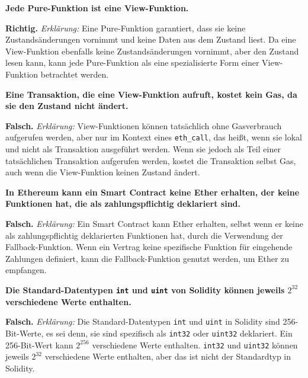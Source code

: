 \documentclass[german]{../uebung}
\begin{document}
\begin{exercise}{4}
    \item \textbf{Jede Pure-Funktion ist eine View-Funktion.}

    \textbf{Richtig.}
    \newline
    \textit{Erklärung:} Eine Pure-Funktion garantiert, dass sie keine Zustandsänderungen vornimmt und keine Daten aus dem Zustand liest. Da eine View-Funktion ebenfalls keine Zustandsänderungen vornimmt, aber den Zustand lesen kann, kann jede Pure-Funktion als eine spezialisierte Form einer View-Funktion betrachtet werden.

    \item \textbf{Eine Transaktion, die eine View-Funktion aufruft, kostet kein Gas, da sie den Zustand nicht ändert.}

    \textbf{Falsch.}
    \newline
    \textit{Erklärung:} View-Funktionen können tatsächlich ohne Gasverbrauch aufgerufen werden, aber nur im Kontext eines \texttt{eth\_call}, das heißt, wenn sie lokal und nicht als Transaktion ausgeführt werden. Wenn sie jedoch als Teil einer tatsächlichen Transaktion aufgerufen werden, kostet die Transaktion selbst Gas, auch wenn die View-Funktion keinen Zustand ändert.

    \item \textbf{In Ethereum kann ein Smart Contract keine Ether erhalten, der keine Funktionen hat, die als zahlungspflichtig deklariert sind.}

    \textbf{Falsch.}
    \newline
    \textit{Erklärung:} Ein Smart Contract kann Ether erhalten, selbst wenn er keine als zahlungspflichtig deklarierten Funktionen hat, durch die Verwendung der Fallback-Funktion. Wenn ein Vertrag keine spezifische Funktion für eingehende Zahlungen definiert, kann die Fallback-Funktion genutzt werden, um Ether zu empfangen.

    \item \textbf{Die Standard-Datentypen \texttt{int} und \texttt{uint} von Solidity können jeweils $2^{32}$ verschiedene Werte enthalten.}

    \textbf{Falsch.}
    \newline
    \textit{Erklärung:} Die Standard-Datentypen \texttt{int} und \texttt{uint} in Solidity sind 256-Bit-Werte, es sei denn, sie sind spezifisch als \texttt{int32} oder \texttt{uint32} deklariert. Ein 256-Bit-Wert kann $2^{256}$ verschiedene Werte enthalten. \texttt{int32} und \texttt{uint32} können jeweils $2^{32}$ verschiedene Werte enthalten, aber das ist nicht der Standardtyp in Solidity.


\end{exercise}
\end{document}
